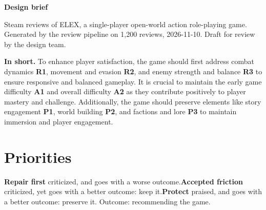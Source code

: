 \documentclass[10pt]{article}
\begin{document}
{\LARGE\textbf{Design brief}}\par\smallskip
{\textcolor{ink2}{Steam reviews of ELEX, a single-player open-world action role-playing game. Generated by the review pipeline on 1,200 reviews, 2026-11-10. Draft for review by the design team.}}

\medskip
\begin{tcolorbox}[colback=head!45,colframe=head,boxrule=0pt,arc=2pt]
\textbf{In short.} To enhance player satisfaction, the game should first address combat dynamics \textbf{R1}, movement and evasion \textbf{R2}, and enemy strength and balance \textbf{R3} to ensure responsive and balanced gameplay. It is crucial to maintain the early game difficulty \textbf{A1} and overall difficulty \textbf{A2} as they contribute positively to player mastery and challenge. Additionally, the game should preserve elements like story engagement \textbf{P1}, world building \textbf{P2}, and factions and lore \textbf{P3} to maintain immersion and player engagement.
\end{tcolorbox}

\section*{Priorities}
{\footnotesize\textcolor{ink2}{\colorbox{lR}{\textcolor{gR}{\textbf{Repair first}}} criticized, and goes with a worse outcome.\quad \colorbox{lA}{\textcolor{gA}{\textbf{Accepted friction}}} criticized, yet goes with a better outcome: keep it.\quad \colorbox{lP}{\textcolor{gP}{\textbf{Protect}}} praised, and goes with a better outcome: preserve it. Outcome: recommending the game.}}
\end{document}
